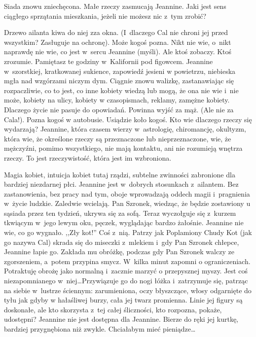\documentclass[oneside,polish,12pt,sfheadings]{mwbk}
\begin{document}
Siada znowu zniechęcona. Małe rzeczy zasmucają Jeannine. Jaki jest
sens ciągłego sprzątania mieszkania, jeżeli nie możesz nic z~tym zrobić?

Drzewo ailanta kiwa do niej zza okna. (I~dlaczego Cal nie chroni jej
przed wszystkim? Zasługuje na ochronę). Może kogoś pozna. Nikt nie
wie, o~nikt naprawdę nie wie, co jest w~sercu Jeannine (myśli). Ale
ktoś zobaczy. Ktoś zrozumie. Pamiętasz te godziny w~Kalifornii pod
figowcem. Jeannine w~szorstkiej, kratkowanej sukience, zapowiedź jesieni
w powietrzu, niebieska mgła nad wzgórzami niczym dym. Ciągnie znowu
walizkę, zastanawiając się rozpaczliwie, co to jest, co inne kobiety
wiedzą lub mogą, że ona nie wie i~nie może, kobiety na ulicy, kobiety
w czasopismach, reklamy, zamężne kobiety. Dlaczego życie nie pasuje
do opowiadań. Powinna wyjść za mąż. (Ale nie za Cala!). Pozna kogoś
w autobusie. Usiądzie koło kogoś. Kto wie dlaczego rzeczy się wydarzają?
Jeannine, która czasem wierzy w~astrologię, chiromancję, okultyzm,
która wie, że określone rzeczy są przeznaczone lub nieprzeznaczone,
wie, że mężczyźni, pomimo wszystkiego, nie mają kontaktu, ani nie
rozumieją wnętrza rzeczy. To jest rzeczywistość, która jest im wzbroniona.

Magia kobiet, intuicja kobiet tutaj rządzi, subtelne zwinności zabronione
dla bardziej niezdarnej płci. Jeannine jest w~dobrych stosunkach z~ailantem. Bez zastanowienia, bez pracy nad tym, oboje wprowadzają
oddech magii i~pragnienia w~życie ludzkie. Zaledwie wcielają. Pan
Szronek, wiedząc, że będzie zostawiony u sąsiada przez ten tydzień,
ukrywa się za sofą. Teraz wyczołguje się z~kurzem tkwiącym w~jego
lewym oku, pęczek, wyglądając bardzo żałośnie. Jeannine nie wie, co
go wygnało. ,,Zły kot!'' Coś z~nią. Patrzy jak Poplamiony Chudy Kot
(jak go nazywa Cal) skrada się do miseczki z~mlekiem i~gdy Pan Szronek
chłepce, Jeannine łapie go. Zakłada mu obróżkę, podczas gdy Pan Szronek
walczy ze zgorszeniem, a~potem przypina smycz. W~kilka minut zapomni
o ograniczeniach. Potraktuję obrożę jako normalną i~zacznie marzyć
o przepysznej myszy. Jest coś niezapomnianego w~niej\ldots Przywiązuje
go do nogi łóżka i~zatrzymuje się, patrząc na siebie w~lustrze ściennym:
zarumieniona, oczy błyszczące, włosy odgarnięte do tyłu jak gdyby
w hałaśliwej burzy, cała jej twarz promienna. Linie jej figury są
doskonałe, ale kto skorzysta z~tej całej śliczności, kto rozpozna,
pokaże, udostępni? Jeannine nie jest dostępna dla Jeannine. Bierze
do ręki jej kurtkę, bardziej przygnębiona niż zwykle. Chciałabym mieć
pieniądze\ldots 
\end{document}

